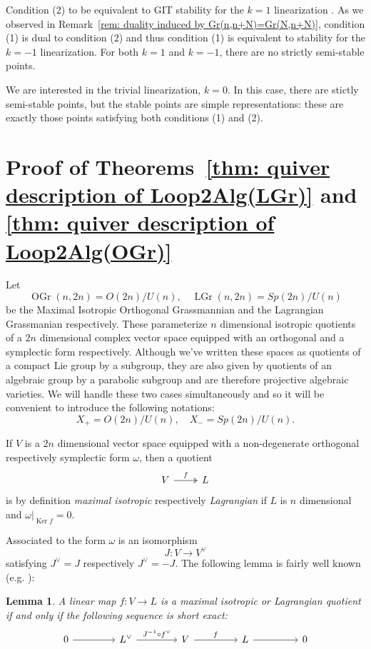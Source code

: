 \documentclass{amsart}
\newtheorem{lemma}[theorem]{Lemma}
\theoremstyle{definition}
\newcommand{\Ker}{\operatorname{Ker}}
\newcommand{\LGr}{\operatorname{LGr}}
\newcommand{\OGr}{\operatorname{OGr}}
\begin{document}
Condition (2) to be equivalent to GIT stability for the $k=1$
linearization \cite[Def.~2.2]{Nakajima-Handsaw}. As we observed in
Remark~\ref{rem: duality induced by Gr(n,n+N)=Gr(N,n+N)}, condition
(1) is dual to condition (2) and thus condition (1) is equivalent to
stability for the $k=-1$ linearization. For both $k=1$ and $k=-1$,
there are no strictly semi-stable points.

We are interested in the trivial linearization, $k=0$. In this case,
there are stictly semi-stable points, but the stable points are simple
representations: these are exactly those points satisfying both
conditions (1) and (2).

\section{Proof of Theorems~\ref{thm: quiver description of
Loop2Alg(LGr)} and \ref{thm: quiver description of
Loop2Alg(OGr)}}\label{sec: proofs of the Omega2(LG/OG) theorems}

Let 
\[
 \OGr (n,2n) = O(2n)/U(n), \quad \LGr (n,2n) = Sp(2n)/U(n)
\]
be the Maximal Isotropic Orthogonal Grassmannian and the Lagrangian
Grassmanian respectively. These parameterize $n$ dimensional isotropic
quotients of a $2n$ dimensional complex vector space equipped with an
orthogonal and a symplectic form respectively. Although we've written
these spaces as quotients of a compact Lie group by a subgroup, they
are also given by quotients of an algebraic group by a parabolic
subgroup and are therefore projective algebraic varieties. We will
handle these two cases simultaneously and so it will be convenient to
introduce the following notations:
\[
X_{+} = O(2n)/U(n), \quad X_{-} = Sp(2n)/U(n).
\]

If $V$ is a $2n$ dimensional vector space equipped with a
non-degenerate orthogonal respectively symplectic form $\omega$, then a
quotient
\[
\begin{tikzcd}
V \arrow[r,  two heads, "f"] & L
\end{tikzcd}
\]
is by definition \emph{maximal isotropic} respectively \emph{Lagrangian} if $L$ is
$n$ dimensional and $\omega |_{\Ker f} = 0$. 

Associated to the form $\omega$ is an isomorphism
\[
J : V\to V^{\vee } 
\]
satisfying $J^{\vee} = J$ respectively $J^{\vee}=-J$. The following
lemma is fairly well known (e.g. \cite[\S~2]{Hitching-2007}):
\begin{lemma}\label{lem: lagrangian quotient condition as a ses}
A linear map $f:V\to L$ is a maximal isotropic or Lagrangian quotient if
and only if the following sequence is short exact:
\[
\begin{tikzcd}[column sep={6em,between origins}]
0 \arrow[r] &
L^{\vee } \arrow[r, "J^{-1}\circ f^{\vee}"] &
V \arrow[r, "f"] &
L \arrow[r] &
0
\end{tikzcd}
\]
\end{lemma}
\end{document}
